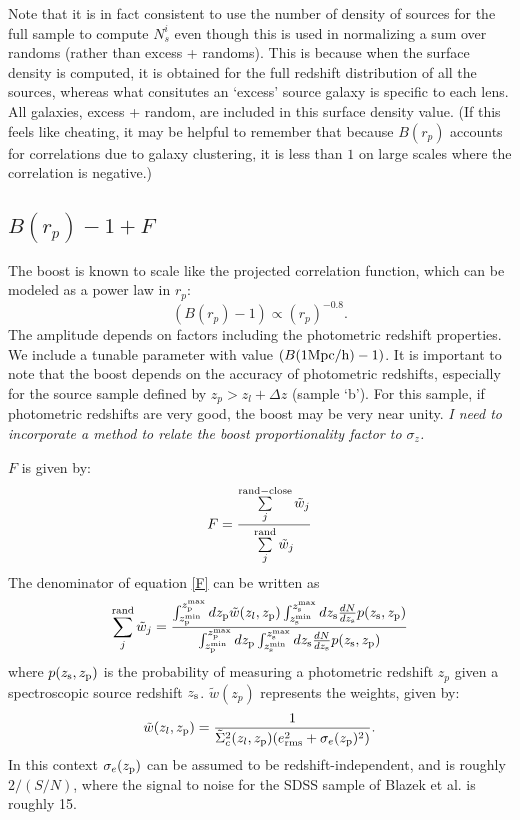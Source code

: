 \documentclass[onecolumn,amsmath,aps,fleqn, superscriptaddress]{revtex4}
\begin{document}
Note that it is in fact consistent to use the number of density of sources for the full sample to compute $N_s^i$ even though this is used in normalizing a sum over randoms (rather than excess + randoms). This is because when the surface density is computed, it is obtained for the full redshift distribution of all the sources, whereas what consitutes an `excess' source galaxy is specific to each lens. All galaxies, excess + random, are included in this surface density value. (If this feels like cheating, it may be helpful to remember that because $B(r_p)$ accounts for correlations due to galaxy clustering, it is less than $1$ on large scales where the correlation is negative.)

\subsection{$B(r_p)-1+F$}

The boost is known to scale like the projected correlation function, which can be modeled as a power law in $r_p$: 
\begin{equation}
(B(r_p)-1) \propto (r_p)^{-0.8}.
\label{boost}
\end{equation}
The amplitude depends on factors including the photometric redshift properties. We include a tunable parameter with value $(B(1 {\rm Mpc/h})-1)$. It is important to note that the boost depends on the accuracy of photometric redshifts, especially for the source sample defined by $z_p>z_l+\Delta z$ (sample `b'). For this sample, if photometric redshifts are very good, the boost may be very near unity. {\it I need to incorporate a method to relate the boost proportionality factor to $\sigma_z$.}

$F$ is given by:
\begin{equation}
F= \frac{\sum\limits_{j}^{\rm rand-close}\tilde{w}_j}{\sum\limits_{j}^{\rm rand} \tilde{w}_j} 
\label{F}
\end{equation}
The denominator of equation \ref{F} can be written as
\begin{equation}
\sum\limits_{j}^{\rm rand} \tilde{w}_j = \frac{\int_{z_{\rm p}^{\rm min}}^{z_{\rm p}^{\rm max}} d z_{\rm p} \tilde{w}(z_l, z_{\rm p}) \int_{z_{\rm s}^{\rm min}}^{z_{\rm s}^{\rm max}} dz_{\rm s} \frac{dN}{dz_{\rm s}} p(z_{\rm s}, z_{\rm p})}{\int_{z_{\rm p}^{\rm min}}^{z_{\rm p}^{\rm max}} d z_{\rm p} \int_{z_{\rm s}^{\rm min}}^{z_{\rm s}^{\rm max}} dz_{\rm s} \frac{dN}{dz_{\rm s}} p(z_{\rm s}, z_{\rm p})}
\label{sumrandweights}
\end{equation}
where $p(z_{\rm s}, z_{\rm p})$ is the probability of measuring a photometric redshift $z_p$ given a spectroscopic source redshift $z_{\rm s}$. $\tilde{w}(z_p)$ represents the weights, given by:
\begin{equation}
\tilde{w}(z_l, z_{\rm p}) = \frac{1}{\tilde{\Sigma}_c^2(z_l, z_{\rm p})(e_{\rm rms}^2 + \sigma_e(z_{\rm p})^2)}.
\label{weights}
\end{equation}
In this context $\sigma_e(z_{\rm p})$ can be assumed to be redshift-independent, and is roughly $2 / (S/N)$, where the signal to noise for the SDSS sample of Blazek et al. is roughly 15.
\end{document}
